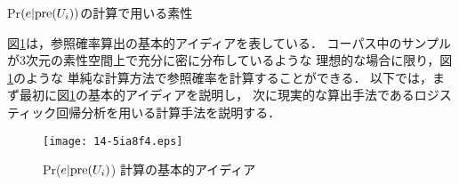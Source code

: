\documentclass[japanese]{jnlp_1.3e}
\begin{document}
\begin{table}[t]
\begin{center}
\caption{Pr$(e|{\rm pre}(U_i))$の計算で用いる素性}
\label{tab:features}

\end{center}
\end{table}

図\ref{fig:pr}は，参照確率算出の基本的アイディアを表している．
コーパス中のサンプルが3次元の素性空間上で充分に密に分布しているような
理想的な場合に限り，図\ref{fig:pr}のような
単純な計算方法で参照確率を計算することができる．
以下では，まず最初に図\ref{fig:pr}の基本的アイディアを説明し，
次に現実的な算出手法であるロジスティック回帰分析を用いる計算手法を説明する．

\begin{figure}[b]
\begin{center}
      \texttt{[image: 14-5ia8f4.eps]}
  \caption{Pr($e|{\rm pre}(U_i)$) 計算の基本的アイディア}
  \label{fig:pr}
 \end{center}
\end{figure}
\end{document}
